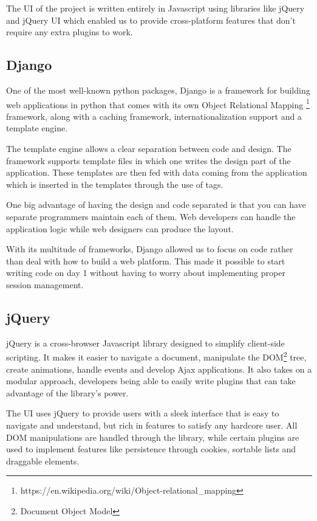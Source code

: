The UI of the project is written entirely in Javascript using libraries like jQuery \cite{jquery} and jQuery UI \cite{jqueryui} which enabled us to provide cross-platform features that don’t require any extra plugins to work.

\subsection{Django}
One of the most well-known python packages, Django \cite{django} is a framework for building web applications in python that comes with its own Object Relational Mapping \footnote{https://en.wikipedia.org/wiki/Object-relational_mapping} framework, along with a caching framework, internationalization support and a template engine.

The template engine allows a clear separation between code and design. The framework supports template files in which one writes the design part of the application. These templates are then fed with data coming from the application which is inserted in the templates through the use of tags.

One big advantage of having the design and code separated is that you can have separate programmers maintain each of them. Web developers can handle the application logic while web designers can produce the layout.

With its multitude of frameworks, Django allowed us to focus on code rather than deal with how to build a web platform. This made it possible to start writing code on day 1 without having to worry about implementing proper session management.

\subsection{jQuery}
jQuery \cite{jquery} is a cross-browser Javascript library designed to simplify client-side scripting. It makes it easier to navigate a document, manipulate the DOM\footnote{Document Object Model} tree, create animations, handle events and develop Ajax applications. It also takes on a modular approach, developers being able to easily write plugins that can take advantage of the library’s power.

The UI uses jQuery to provide users with a sleek interface that is easy to navigate and understand, but rich in features to satisfy any hardcore user. All DOM manipulations are handled through the library, while certain plugins are used to implement features like persistence through cookies, sortable lists and draggable elements.

